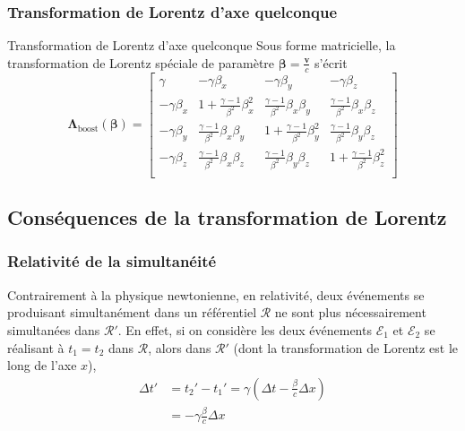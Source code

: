         \subsubsection{Transformation de Lorentz d’axe quelconque}

        \begin{omed}{Transformation de Lorentz d’axe quelconque}
            Sous forme matricielle, la transformation de Lorentz spéciale de paramètre $\symbf{\beta} = \frac{\mathbf{v}}{c}$ s’écrit 
            \[ \symbf{\Lambda}_{\text{boost}}(\symbf{\beta}) = \begin{bmatrix}
                \gamma & -\gamma \beta_x & - \gamma \beta_y & - \gamma \beta_z \\
                -\gamma \beta_x & 1 + \frac{\gamma - 1}{\beta^2} \beta_x^2  & \frac{\gamma - 1}{\beta^2} \beta_x \beta_y & \frac{\gamma - 1}{\beta^2} \beta_x \beta_z \\
                -\gamma \beta_y & \frac{\gamma - 1}{\beta^2} \beta_x \beta_y & 1 + \frac{\gamma - 1}{\beta^2} \beta_y^2 & \frac{\gamma - 1}{\beta^2} \beta_y \beta_z \\
                -\gamma \beta_z & \frac{\gamma - 1}{\beta^2} \beta_x \beta_z & \frac{\gamma - 1}{\beta^2} \beta_y \beta_z & 1 + \frac{\gamma - 1}{\beta^2} \beta_z^2 \\
            \end{bmatrix} \]
        \end{omed}

    \subsection{Conséquences de la transformation de Lorentz}

        \subsubsection{Relativité de la simultanéité}

        Contrairement à la physique newtonienne, en relativité, deux événements se produisant simultanément dans un référentiel $\mathcal{R}$ ne sont plus nécessairement simultanées dans $\mathcal{R}'$. En effet, si on considère les deux événements $\mathcal{E}_1$ et $\mathcal{E}_2$ se réalisant à $t_1 = t_2$ dans $\mathcal{R}$, alors dans $\mathcal{R}'$ (dont la transformation de Lorentz est le long de l’axe $x$), 
        \begin{align*}
            \Delta t' &= t_2' - t_1' = \gamma\left(\Delta t - \frac{\beta}{c} \Delta x\right) \\
            &= - \gamma \frac{\beta}{c} \Delta x \\
        \end{align*}

